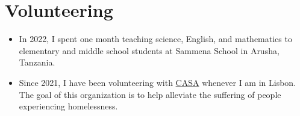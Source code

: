 
\section{Volunteering}

\vspace{4pt}

\begin{itemize}
    \item In 2022, I spent one month teaching science, English, and mathematics to elementary and middle school students at Sammena School in Arusha, Tanzania.
    \item Since 2021, I have been volunteering with \href{https://www.casa-apoioaosemabrigo.org/casa-a-associacao/}{CASA} whenever I am in Lisbon. The goal of this organization is to help alleviate the suffering of people experiencing homelessness. 
\end{itemize}
